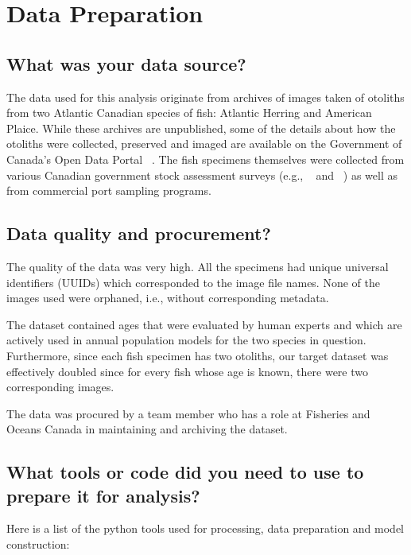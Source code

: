 \section{Data Preparation}

\subsection{What was your data source?}


The data used for this analysis originate from archives of images taken of otoliths from two Atlantic Canadian species of fish: Atlantic Herring and American Plaice.
While these archives are unpublished, some of the details about how the otoliths were collected, preserved and imaged are available on the Government of Canada's Open Data Portal ~\cite{ogp_plaice}.
The fish specimens themselves were collected from various Canadian government stock assessment surveys (e.g., ~\cite{groundfish} and ~\cite{ns_strait}) as well as from commercial port sampling programs.

\subsection{Data quality and procurement?}

The quality of the data was very high.
All the specimens had unique universal identifiers (UUIDs) which corresponded to the image file names.
None of the images used were orphaned, i.e., without corresponding metadata.

The dataset contained ages that were evaluated by human experts and which are actively used in annual population models for the two species in question.
Furthermore, since each fish specimen has two otoliths, our target dataset was effectively doubled since for every fish whose age is known, there were two corresponding images.

The data was procured by a team member who has a role at Fisheries and Oceans Canada in maintaining and archiving the dataset.

\subsection{What tools or code did you need to use to prepare it for analysis?}

Here is a list of the python tools used for processing, data preparation and model construction:

